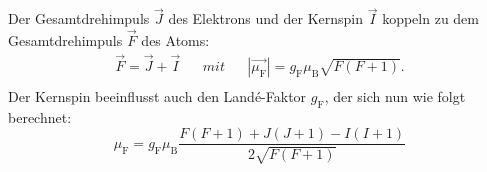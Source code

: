 Der Gesamtdrehimpuls $\vec{J}$ des Elektrons und der Kernspin $\vec{I}$ koppeln zu dem Gesamtdrehimpuls $\vec{F}$ des Atoms:
\begin{align*}
  \vec{F}=\vec{J}+\vec{I} && mit && |\vec{\mu_{\text{F}}}|= g_{\text{F}} \mu_{\text{B}} \sqrt{F(F+1)}.\\
\end{align*}
Der Kernspin beeinflusst auch den Landé-Faktor $g_{\text{F}}$, der sich nun wie folgt berechnet:
\begin{equation}
  \mu_{\text{F}}= g_{\text{F}} \mu_{\text{B}} \frac{F(F+1) + J(J+1) - I(I+1)}{2 \sqrt{F(F+1)}}
  \label{eqn:landef}
\end{equation}
%
%
